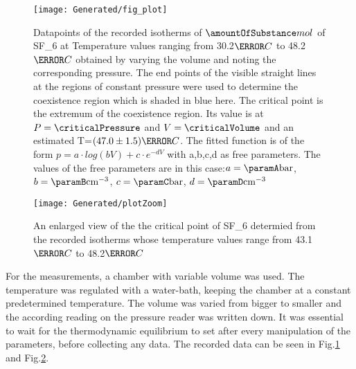\documentclass[a4paper,10pt,twocolumn]{article}
\begin{document}
    \begin{figure}
        \begin{center}
            \texttt{[image: Generated/fig\_plot]}
            \caption[]{Datapoints of the recorded isotherms of $\amountOfSubstance mol$ of SF_6\) at Temperature values ranging from 30.2$\degree C$ to 48.2$\degree C$ obtained by varying the volume and noting the corresponding pressure. The end points of the visible straight lines at the regions of constant pressure were
            used to determine the coexistence region which is shaded in blue here. The critical point is the extremum of the coexistence region. Its value is at $P=\criticalPressure$ and $V=\criticalVolume$ and an estimated
            T=$(47.0\pm1.5)\degree C$.
            The fitted function is of the form $p = a \cdot log(bV) + c\cdot e^{-dV}$ with a,b,c,d as free parameters.
            The values of the free parameters are in this case:$a = \paramA \text{bar} $, $b = \paramB \text{cm}^{-3} $, $c = \paramC \text{bar}$, $d = \paramD \text{cm}^{-3}$}

            \label{binodal}
        \end{center}
    \end{figure}
    \begin{figure}
        \begin{center}
            \texttt{[image: Generated/plotZoom]}
            \caption[]{An enlarged view of the the critical point of SF_6\) determied from the recorded isotherms whose temperature values range from 43.1$\degree C$ to 48.2$\degree C$}
            \label{ZoomedIn}
        \end{center}
    \end{figure}
    For the measurements, a chamber with variable volume was used.
    The temperature was regulated with a water-bath, keeping the chamber at a constant predetermined temperature.
    The volume was varied from bigger to smaller and the according reading on the pressure reader was written down.
    It was essential to wait for the thermodynamic equilibrium to set after every manipulation of the parameters, before collecting any data.
    The recorded data can be seen in Fig.\ref{binodal} and Fig.\ref{ZoomedIn}.
\end{document}
